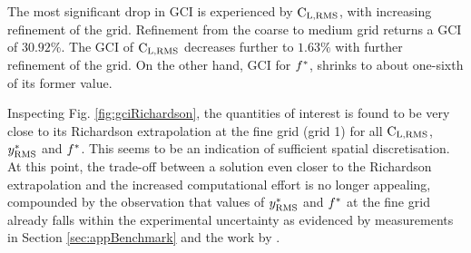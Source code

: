 \documentclass[oneside]{utmthesis}
\begin{document}
The most significant drop in GCI is experienced by $\text{C}_{\text{L,RMS}}$, with increasing refinement of the grid. Refinement from the coarse to medium grid returns a GCI of $30.92\%$. The GCI of $\text{C}_{\text{L,RMS}}$ decreases further to $1.63\%$ with further refinement of the grid. On the other hand, GCI for $f^{*}$, shrinks to about one-sixth of its former value.

Inspecting Fig. \ref{fig:gciRichardson}, the quantities of interest is found to be very close to its Richardson extrapolation at the fine grid (grid 1) for all $\text{C}_{\text{L,RMS}}$, $y^{*}_{\text{RMS}}$ and $f^{*}$. This seems to be an indication of sufficient spatial discretisation. At this point, the trade-off between a solution even closer to the Richardson extrapolation and the increased computational effort is no longer appealing, compounded by the observation that values of $y^{*}_{\text{RMS}}$ and $f^{*}$ at the fine grid already falls within the experimental uncertainty as evidenced by measurements in Section \ref{sec:appBenchmark} and the work by \citet{Koide2013}.


\end{document}
